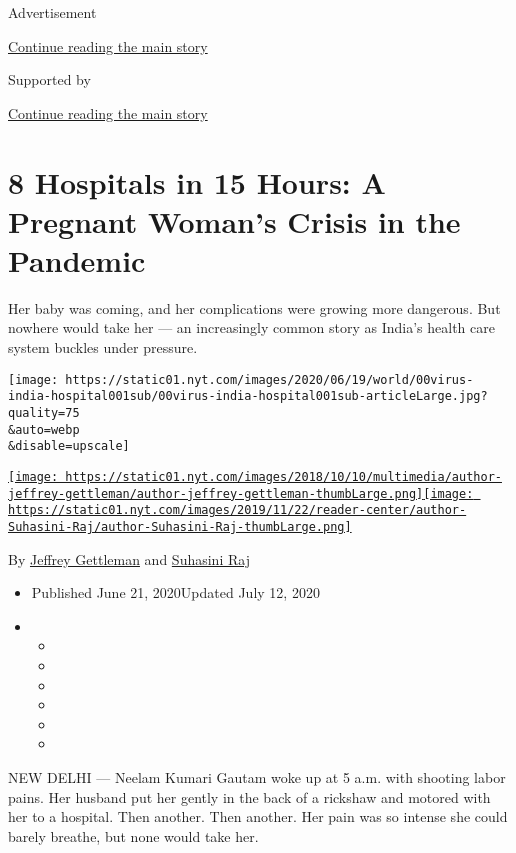 Advertisement

\protect\hyperlink{after-top}{Continue reading the main story}

Supported by

\protect\hyperlink{after-sponsor}{Continue reading the main story}

\hypertarget{8-hospitals-in-15-hours-a-pregnant-womans-crisis-in-the-pandemic}{%
\section{8 Hospitals in 15 Hours: A Pregnant Woman's Crisis in the
Pandemic}\label{8-hospitals-in-15-hours-a-pregnant-womans-crisis-in-the-pandemic}}

Her baby was coming, and her complications were growing more dangerous.
But nowhere would take her --- an increasingly common story as India's
health care system buckles under pressure.

\texttt{[image: https://static01.nyt.com/images/2020/06/19/world/00virus-india-hospital001sub/00virus-india-hospital001sub-articleLarge.jpg?quality=75\\\&auto=webp\\\&disable=upscale]}

\href{https://www.nytimes.com/by/jeffrey-gettleman}{\texttt{[image: https://static01.nyt.com/images/2018/10/10/multimedia/author-jeffrey-gettleman/author-jeffrey-gettleman-thumbLarge.png]}}\href{https://www.nytimes.com/by/suhasini-raj}{\texttt{[image: https://static01.nyt.com/images/2019/11/22/reader-center/author-Suhasini-Raj/author-Suhasini-Raj-thumbLarge.png]}}

By \href{https://www.nytimes.com/by/jeffrey-gettleman}{Jeffrey
Gettleman} and \href{https://www.nytimes.com/by/suhasini-raj}{Suhasini
Raj}

\begin{itemize}
\item
  Published June 21, 2020Updated July 12, 2020
\item
  \begin{itemize}
  \item
  \item
  \item
  \item
  \item
  \item
  \end{itemize}
\end{itemize}

NEW DELHI --- Neelam Kumari Gautam woke up at 5 a.m. with shooting labor
pains. Her husband put her gently in the back of a rickshaw and motored
with her to a hospital. Then another. Then another. Her pain was so
intense she could barely breathe, but none would take her.

